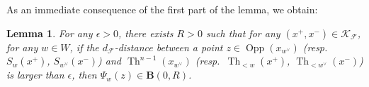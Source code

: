 \documentclass[12pt]{amsbook}%
\newtheorem{lem}[thm]{Lemma}
\theoremstyle{definition}
\theoremstyle{remark}
\numberwithin{section}{chapter}
\numberwithin{subsection}{section}
\numberwithin{figure}{chapter}
\DeclareMathOperator{\Th}{Th}
\DeclareMathOperator{\Opp}{Opp}
\def\eps{\epsilon}
\def\dF{d_{\mathcal{F}}}
\def\dyl{>0}
\def\cF{{\mathscr{F}}}
\def\xpair{{(x^+,x^-)}}
\begin{document}
{{%




As an immediate consequence of the first part of the lemma, we obtain: 

\begin{lem}\label{uniform_r1r2}
For any $\epsilon>0$, there exists $R\dyl$ such that for any $\xpair\in \mathscr{K}_\cF$, for any $w\in W$, if the $d_{\cF}$-distance between a point $z\in \Opp(x_{w^\vee})$ (resp.\ $S_w(x^+)$, $S_{w^\vee}(x^-)$) and $\Th^{n-1}(x_{w^\vee})$ (resp.\ $\Th_{<w}(x^+)$, $\Th_{<w^\vee}(x^-)$) is larger than $\eps$, then $\Psi_w(z)\in \mathbf{B}(0,R)$.
\end{lem}


}}
\end{document}
